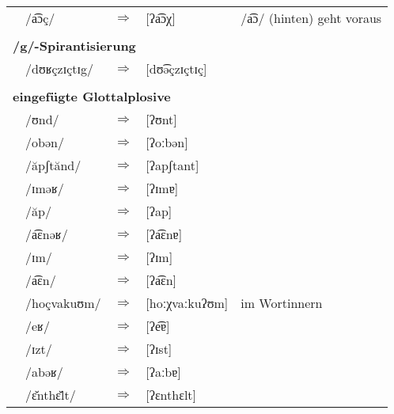 \begin{longtable}[l]{p{0.1mm}lcll}
    & /a͡ɔç/              & $\Rightarrow$ & [ʔa͡ɔχ]              & /a͡ɔ/ (hinten) geht voraus         \\
  \multicolumn{5}{l}{ }                                                                            \\
  \multicolumn{5}{l}{\textbf{/g/-Spirantisierung}}                                                 \\
    & /dʊʁçzɪçtɪg/       & $\Rightarrow$ & [dʊ͡əçzɪçtɪç]        &                                   \\
  \multicolumn{5}{l}{ }                                                                            \\
  \multicolumn{5}{l}{\textbf{eingefügte Glottalplosive}}                                           \\
    & /ʊnd/              & $\Rightarrow$ & [ʔʊnt]              &                                   \\
    & /obən/             & $\Rightarrow$ & [ʔoːbən]            &                                   \\
    & /ăpʃtănd/          & $\Rightarrow$ & [ʔapʃtant]          &                                   \\
    & /ɪməʁ/             & $\Rightarrow$ & [ʔɪmɐ]              &                                   \\
    & /ăp/               & $\Rightarrow$ & [ʔap]               &                                   \\
    & /a͡ɛnəʁ/            & $\Rightarrow$ & [ʔa͡ɛnɐ]             &                                   \\
    & /ɪm/               & $\Rightarrow$ & [ʔɪm]               &                                   \\
    & /a͡ɛn/              & $\Rightarrow$ & [ʔa͡ɛn]              &                                   \\
    & /hoçvakuʊm/        & $\Rightarrow$ & [hoːχvaːkuʔʊm]      & im Wortinnern                     \\
    & /eʁ/               & $\Rightarrow$ & [ʔe͡ɐ]               &                                   \\
    & /ɪzt/              & $\Rightarrow$ & [ʔɪst]              &                                   \\
    & /abəʁ/             & $\Rightarrow$ & [ʔaːbɐ]             &                                   \\
    & /ɛ̆nthɛ̆lt/          & $\Rightarrow$ & [ʔɛnthɛlt]          &                                   \\

\end{longtable}
